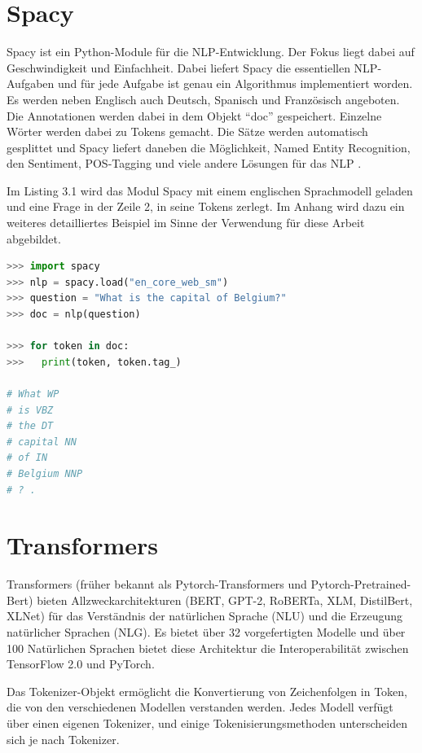 \documentclass[
        ngerman,
        paper=a4,
        numbers=noendperiod,
]{scrreprt}
\begin{document}
\section{Spacy}
Spacy ist ein Python-Module für die NLP-Entwicklung. Der Fokus liegt dabei auf Geschwindigkeit und Einfachheit. Dabei liefert Spacy die essentiellen NLP-Aufgaben und für jede Aufgabe ist genau ein Algorithmus implementiert worden. Es werden neben Englisch auch Deutsch, Spanisch und Französisch angeboten. Die Annotationen werden dabei in dem Objekt \enquote{doc} gespeichert. Einzelne Wörter werden dabei zu Tokens gemacht. Die Sätze werden automatisch gesplittet und Spacy liefert daneben die Möglichkeit, Named Entity Recognition, den Sentiment, POS-Tagging und viele andere Lösungen für das NLP \citep{SpaCyDocumentation}.

Im Listing 3.1 wird das Modul Spacy mit einem englischen Sprachmodell geladen und eine Frage in der Zeile 2, in seine Tokens zerlegt. Im Anhang wird dazu ein weiteres detailliertes Beispiel im Sinne der Verwendung für diese Arbeit abgebildet.

\begin{lstlisting}[language=Python, caption=Spacy Beispiel]
>>> import spacy
>>> nlp = spacy.load("en_core_web_sm")
>>> question = "What is the capital of Belgium?"
>>> doc = nlp(question)

>>> for token in doc:
>>>   print(token, token.tag_)

# What WP                                    
# is VBZ                                     
# the DT                                     
# capital NN            
# of IN
# Belgium NNP
# ? .

\end{lstlisting}

\section{Transformers}
Transformers (früher bekannt als Pytorch-Transformers und Pytorch-Pretrained-Bert) bieten Allzweckarchitekturen (BERT, GPT-2, RoBERTa, XLM, DistilBert, XLNet) für das Verständnis der natürlichen Sprache (NLU) und die Erzeugung natürlicher Sprachen (NLG). Es bietet über 32 vorgefertigten Modelle und über 100 Natürlichen Sprachen bietet diese Architektur die Interoperabilität zwischen TensorFlow 2.0 und PyTorch.

Das Tokenizer-Objekt ermöglicht die Konvertierung von Zeichenfolgen in Token, die von den verschiedenen Modellen verstanden werden. Jedes Modell verfügt über einen eigenen Tokenizer, und einige Tokenisierungsmethoden unterscheiden sich je nach Tokenizer.
\end{document}
